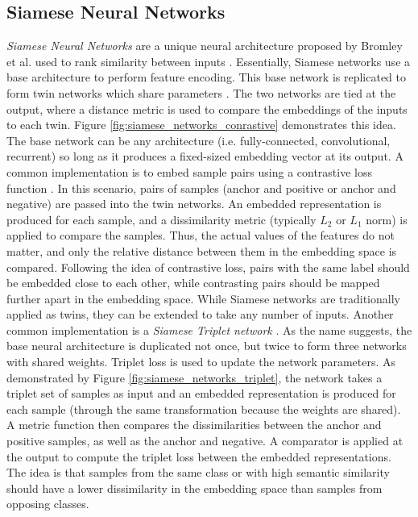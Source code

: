 		
		\subsection{Siamese Neural Networks}
		\textit{Siamese Neural Networks} are a unique neural architecture proposed by Bromley et al. used to rank similarity between inputs \citep{Bromley1993SiameseNetworks}.  Essentially, Siamese networks use a base architecture to perform feature encoding.  This base network is replicated to form twin networks which share parameters \citep{Koch2015SiameseNetworks,Koch2015SiameseNetworksThesis}. The two networks are tied at the output, where a distance metric is used to compare the embeddings of the inputs to each twin.  Figure \ref{fig:siamese_networks_conrastive} demonstrates this idea.  The base network can be any architecture (i.e. fully-connected, convolutional, recurrent) so  long as it produces a fixed-sized embedding vector at its output.  A common implementation is to embed sample pairs using a contrastive loss function \citep{Koch2015SiameseNetworks}.  In this scenario, pairs of samples (anchor and positive or anchor and negative) are passed into the twin networks.  An embedded representation is produced for each sample, and a dissimilarity metric (typically $L_{2}$ or $L_{1}$ norm) is applied to compare the samples.  Thus, the actual values of the features do not matter, and only the relative distance between them in the embedding space is compared.  Following the idea of contrastive loss, pairs with the same label should be embedded close to each other, while contrasting pairs should be mapped further apart in the embedding space.  While Siamese networks are traditionally applied as twins, they can be extended to take any number of inputs.  Another common implementation is a \textit{Siamese Triplet network} \citep{Hoffer2015DeepMetricLearning}.  As the name suggests, the base neural architecture is duplicated not once, but twice to form three networks with shared weights.  Triplet loss is used to update the network parameters.  As demonstrated by Figure \ref{fig:siamese_networks_triplet}, the network takes a triplet set of samples as input and an embedded representation is produced for each sample (through the same transformation because the weights are shared).  A metric function then compares the dissimilarities between the anchor and positive samples, as well as the anchor and negative.  A comparator is applied at the output to compute the triplet loss between the embedded representations.  The idea is that samples from the same class or with high semantic similarity should have a lower dissimilarity in the embedding space than samples  from opposing classes.
		

